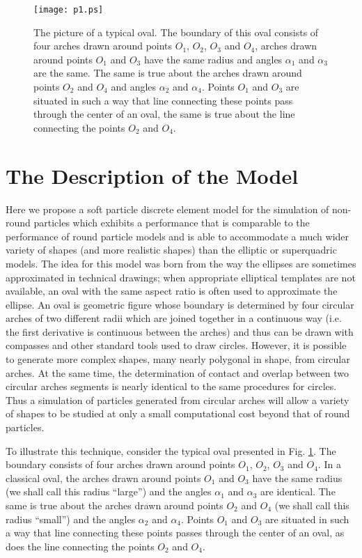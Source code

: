 \documentclass[granma]{svjour}
\begin{document}
\begin{figure}
\texttt{[image: p1.ps]}
\caption{The picture of a typical oval. The
boundary of this oval consists
of four arches drawn around points $O_1$, $O_2$, $O_3$ and $O_4$, arches
drawn around points $O_1$ and $O_3$ have the same radius and angles
$\alpha_1$ and $\alpha_3$ are the same. The same is true about the arches
drawn around points $O_2$ and $O_4$ and angles $\alpha_2$ and $\alpha_4$.
Points $O_1$ and $O_3$ are situated in such a way that line connecting these
points pass through the center of an oval, the same is true about the line
connecting the points $O_2$ and $O_4$.}\label{fig1}
\end{figure}


\section{The Description of the Model}


Here we propose a soft particle discrete element model for the simulation of
non-round particles which exhibits a performance that is comparable to the
performance of round particle models and is able to accommodate a much wider
variety of shapes (and more realistic shapes) than the elliptic or
superquadric models. The idea for this model was born from the way the
ellipses are sometimes approximated in technical drawings; when appropriate
elliptical templates are not available, an oval with the same aspect ratio is
often used to approximate the ellipse. An oval is geometric figure whose
boundary is determined by four circular arches of two different radii which
are joined together in a continuous way (i.e. the first derivative is
continuous between the arches) and thus can be drawn with compasses and other
standard tools used to draw circles. However, it is possible to generate more
complex shapes, many nearly polygonal in shape, from circular arches. At the
same time, the determination of contact and overlap between two circular
arches segments is nearly identical to the same procedures for circles. Thus
a simulation of particles generated from circular arches will allow a variety
of shapes to be studied at only a small computational cost beyond that of
round particles.


To illustrate this technique, consider the typical oval presented in
Fig. \ref{fig1}.
The boundary consists of four arches drawn around points $O_1$, $O_2$,
$O_3$ and $O_4$. In a classical oval, the arches drawn around points $O_1$
and $O_3$ have the same radius (we shall call this radius ``large'') and the
angles $\alpha_1$ and $\alpha_3$ are identical. The same is true about the
arches drawn around points $O_2$ and $O_4$ (we shall call this radius
``small'') and the angles $\alpha_2$ and $\alpha_4$. Points $O_1$ and $O_3$
are situated in such a way that line connecting these points passes through
the center of an oval, as does the line connecting the points $O_2$ and $O_4$.
\end{document}

